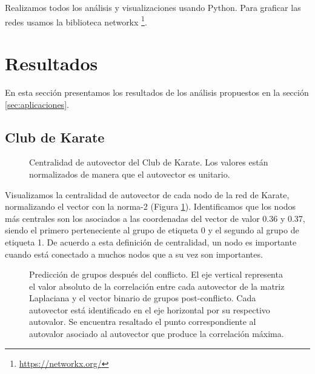 \documentclass{article}
\begin{document}
Realizamos todos los análisis y visualizaciones usando Python. Para graficar las redes usamos la biblioteca networkx \footnote{\url{https://networkx.org/}}.



\section{Resultados} \label{sec:resultados}

En esta sección presentamos los resultados de los análisis propuestos en la sección \ref{sec:aplicaciones}. 



\subsection{Club de Karate} \label{sec:karate_resultados}

\begin{figure}[!ht]
    \centering
    
    \caption{
    Centralidad de autovector del Club de Karate. Los valores están normalizados de manera que el autovector es unitario. 
    } 
    \label{fig:karate_centralidad}
\end{figure}

Visualizamos la centralidad de autovector de cada nodo de la red de Karate, normalizando el vector con la norma-2 (Figura \ref{fig:karate_centralidad}). Identificamos que los nodos más centrales son los asociados a las coordenadas del vector de valor 0.36 y 0.37, siendo el primero perteneciente al grupo de etiqueta 0 y el segundo al grupo de etiqueta 1. De acuerdo a esta definición de centralidad, un nodo es importante cuando está conectado a muchos nodos que a su vez son importantes.


\begin{figure}[!ht]
    \centering
    
    \caption{
    Predicción de grupos después del conflicto. El eje vertical representa el valor absoluto de la correlación entre cada autovector de la matriz Laplaciana y el vector binario de grupos post-conflicto. Cada autovector está identificado en el eje horizontal por su respectivo autovalor. Se encuentra resaltado el punto correspondiente al autovalor asociado al autovector que produce la correlación máxima.
    } 
    \label{fig:karate_correlaciones}
\end{figure}
\end{document}
